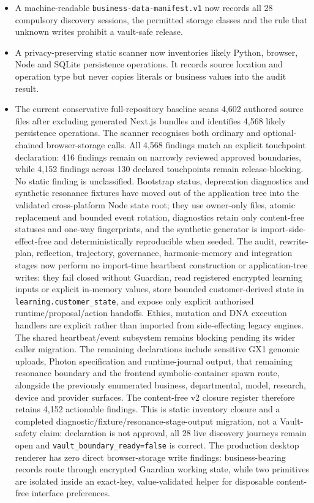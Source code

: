 \documentclass[11pt]{article}
\newcommand{\code}[1]{\texttt{#1}}
\begin{document}
\begin{itemize}
  \item A machine-readable \code{business-data-manifest.v1} now records all 28 compulsory discovery sessions, the permitted storage classes and the rule that unknown writes prohibit a vault-safe release.
  \item A privacy-preserving static scanner now inventories likely Python, browser, Node and SQLite persistence operations. It records source location and operation type but never copies literals or business values into the audit result.
  \item The current conservative full-repository baseline scans 4,602 authored source files after excluding generated Next.js bundles and identifies 4,568 likely persistence operations. The scanner recognises both ordinary and optional-chained browser-storage calls. All 4,568 findings match an explicit touchpoint declaration: 416 findings remain on narrowly reviewed approved boundaries, while 4,152 findings across 130 declared touchpoints remain release-blocking. No static finding is unclassified. Bootstrap status, deprecation diagnostics and synthetic resonance fixtures have moved out of the application tree into the validated cross-platform Node state root; they use owner-only files, atomic replacement and bounded event rotation, diagnostics retain only content-free statuses and one-way fingerprints, and the synthetic generator is import-side-effect-free and deterministically reproducible when seeded. The audit, rewrite-plan, reflection, trajectory, governance, harmonic-memory and integration stages now perform no import-time heartbeat construction or application-tree writes: they fail closed without Guardian, read registered encrypted learning inputs or explicit in-memory values, store bounded customer-derived state in \code{learning.customer\_state}, and expose only explicit authorised runtime/proposal/action handoffs. Ethics, mutation and DNA execution handlers are explicit rather than imported from side-effecting legacy engines. The shared heartbeat/event subsystem remains blocking pending its wider caller migration. The remaining declarations include sensitive GX1 genomic uploads, Photon specification and runtime-journal output, that remaining resonance boundary and the frontend symbolic-container spawn route, alongside the previously enumerated business, departmental, model, research, device and provider surfaces. The content-free v2 closure register therefore retains 4,152 actionable findings. This is static inventory closure and a completed diagnostic/fixture/resonance-stage-output migration, not a Vault-safety claim: declaration is not approval, all 28 live discovery journeys remain open and \code{vault\_boundary\_ready=false} is correct. The production desktop renderer has zero direct browser-storage write findings: business-bearing records route through encrypted Guardian working state, while two primitives are isolated inside an exact-key, value-validated helper for disposable content-free interface preferences.

\end{itemize}
\end{document}
